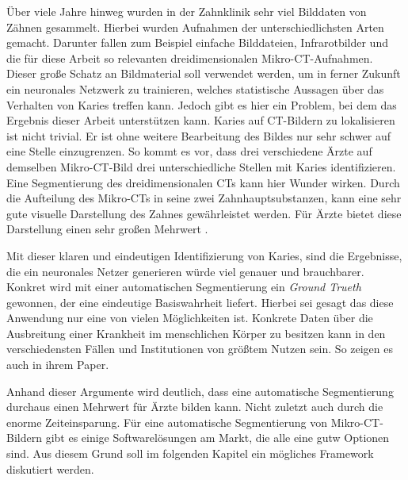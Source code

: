 Über viele Jahre hinweg wurden in der Zahnklinik sehr viel Bilddaten von Zähnen
gesammelt. Hierbei wurden Aufnahmen der unterschiedlichsten Arten gemacht.
Darunter fallen zum Beispiel einfache Bilddateien, Infrarotbilder und die für diese
Arbeit so relevanten dreidimensionalen Mikro-CT-Aufnahmen. Dieser große Schatz
an Bildmaterial soll verwendet werden, um in ferner Zukunft ein neuronales Netzwerk
zu trainieren, welches statistische Aussagen über das Verhalten von Karies
treffen kann. Jedoch gibt es hier ein Problem, bei dem das Ergebnis dieser
Arbeit unterstützen kann. Karies auf \ac{CT}-Bildern zu lokalisieren ist nicht
trivial. Er ist ohne weitere Bearbeitung des Bildes nur sehr schwer auf eine Stelle
einzugrenzen. So kommt es vor, dass drei verschiedene Ärzte auf demselben Mikro-\ac{CT}-Bild
drei unterschiedliche Stellen mit Karies identifizieren. Eine Segmentierung des dreidimensionalen
\ac{CT}s kann hier Wunder wirken. Durch die Aufteilung des Mikro-\ac{CT}s in
seine zwei Zahnhauptsubstanzen, kann eine sehr gute visuelle Darstellung des Zahnes
gewährleistet werden. Für Ärzte bietet diese Darstellung einen sehr großen
Mehrwert \citep[vgl.][S.~1]{walter2025projekt}.

Mit dieser klaren und eindeutigen Identifizierung von Karies, sind die
Ergebnisse, die ein neuronales Netzer generieren würde viel genauer und brauchbarer.
Konkret wird mit einer automatischen Segmentierung ein \textit{Ground Trueth} gewonnen,
der eine eindeutige Basiswahrheit liefert. Hierbei sei gesagt das diese Anwendung
nur eine von vielen Möglichkeiten ist. Konkrete Daten über die Ausbreitung einer
Krankheit im menschlichen Körper zu besitzen kann in den verschiedensten Fällen
und Institutionen von größtem Nutzen sein. So zeigen es auch \citet[S.~207]{de20083d}
in ihrem Paper.

Anhand dieser Argumente wird deutlich, dass eine automatische Segmentierung durchaus
einen Mehrwert für Ärzte bilden kann. Nicht zuletzt auch durch die enorme
Zeiteinsparung. Für eine automatische Segmentierung von Mikro-\ac{CT}-Bildern
gibt es einige Softwarelösungen am Markt, die alle eine gutw Optionen sind. Aus
diesem Grund soll im folgenden Kapitel ein mögliches Framework diskutiert werden.

